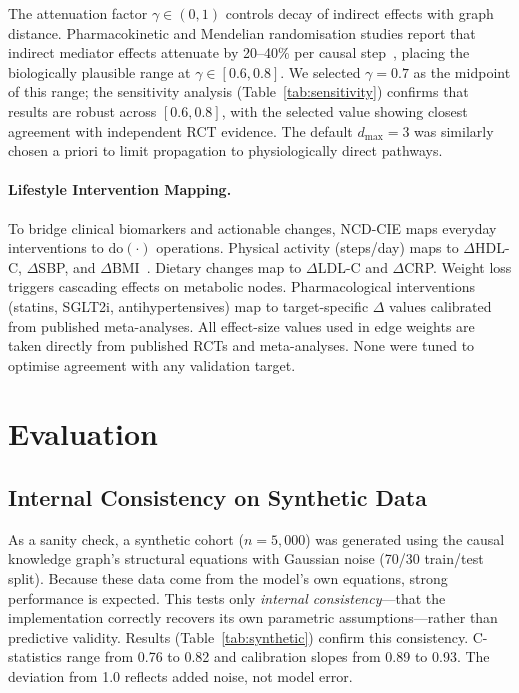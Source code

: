 \documentclass[runningheads]{llncs}
\begin{document}
The attenuation factor $\gamma \in (0,1)$ controls decay of indirect
effects with graph distance.
Pharmacokinetic and Mendelian randomisation studies report that
indirect mediator effects attenuate by 20--40\% per causal
step~\cite{ctt2010,pearl2009causality}, placing the biologically
plausible range at $\gamma \in [0.6, 0.8]$.
We selected $\gamma = 0.7$ as the midpoint of this range; the
sensitivity analysis (Table~\ref{tab:sensitivity}) confirms that
results are robust across $[0.6, 0.8]$, with the selected value
showing closest agreement with independent RCT evidence.
The default $d_{\max} = 3$ was similarly chosen a priori to limit
propagation to physiologically direct pathways.

\paragraph{Lifestyle Intervention Mapping.}
To bridge clinical biomarkers and actionable changes, NCD-CIE maps
everyday interventions to $\mathrm{do}(\cdot)$ operations.
Physical activity (steps/day) maps to $\Delta$HDL-C, $\Delta$SBP,
and $\Delta$BMI~\cite{naci2018comparative}.
Dietary changes map to $\Delta$LDL-C and $\Delta$CRP\@.
Weight loss triggers cascading effects on metabolic nodes.
Pharmacological interventions (statins, SGLT2i, antihypertensives)
map to target-specific $\Delta$ values calibrated from published
meta-analyses.
All effect-size values used in edge weights are taken directly from
published RCTs and meta-analyses.
None were tuned to optimise agreement with any validation target.

\section{Evaluation}\label{sec:validation}

\subsection{Internal Consistency on Synthetic Data}\label{sec:synthetic}

As a sanity check, a synthetic cohort ($n = 5{,}000$) was generated
using the causal knowledge graph's structural equations with Gaussian
noise (70/30 train/test split).
Because these data come from the model's own equations, strong
performance is expected.
This tests only \emph{internal consistency}---that the implementation
correctly recovers its own parametric assumptions---rather than
predictive validity.
Results (Table~\ref{tab:synthetic}) confirm this consistency.
C-statistics range from 0.76 to 0.82 and calibration slopes from
0.89 to 0.93.
The deviation from 1.0 reflects added noise, not model error.
\end{document}
